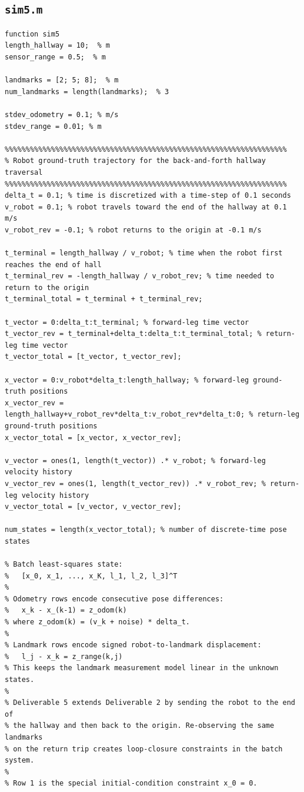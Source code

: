 \documentclass[11pt]{article}
\begin{document}
\subsection*{\texttt{sim5.m}}
\begin{lstlisting}[caption={sim5.m}, label={lst:sim5}]
function sim5
length_hallway = 10;  % m
sensor_range = 0.5;  % m

landmarks = [2; 5; 8];  % m
num_landmarks = length(landmarks);  % 3

stdev_odometry = 0.1; % m/s
stdev_range = 0.01; % m

%%%%%%%%%%%%%%%%%%%%%%%%%%%%%%%%%%%%%%%%%%%%%%%%%%%%%%%%%%%%%%%%%%%
% Robot ground-truth trajectory for the back-and-forth hallway traversal
%%%%%%%%%%%%%%%%%%%%%%%%%%%%%%%%%%%%%%%%%%%%%%%%%%%%%%%%%%%%%%%%%%%
delta_t = 0.1; % time is discretized with a time-step of 0.1 seconds
v_robot = 0.1; % robot travels toward the end of the hallway at 0.1 m/s
v_robot_rev = -0.1; % robot returns to the origin at -0.1 m/s

t_terminal = length_hallway / v_robot; % time when the robot first reaches the end of hall
t_terminal_rev = -length_hallway / v_robot_rev; % time needed to return to the origin
t_terminal_total = t_terminal + t_terminal_rev;

t_vector = 0:delta_t:t_terminal; % forward-leg time vector
t_vector_rev = t_terminal+delta_t:delta_t:t_terminal_total; % return-leg time vector
t_vector_total = [t_vector, t_vector_rev];

x_vector = 0:v_robot*delta_t:length_hallway; % forward-leg ground-truth positions
x_vector_rev = length_hallway+v_robot_rev*delta_t:v_robot_rev*delta_t:0; % return-leg ground-truth positions
x_vector_total = [x_vector, x_vector_rev];

v_vector = ones(1, length(t_vector)) .* v_robot; % forward-leg velocity history
v_vector_rev = ones(1, length(t_vector_rev)) .* v_robot_rev; % return-leg velocity history
v_vector_total = [v_vector, v_vector_rev];

num_states = length(x_vector_total); % number of discrete-time pose states

% Batch least-squares state:
%   [x_0, x_1, ..., x_K, l_1, l_2, l_3]^T
%
% Odometry rows encode consecutive pose differences:
%   x_k - x_(k-1) = z_odom(k)
% where z_odom(k) = (v_k + noise) * delta_t.
%
% Landmark rows encode signed robot-to-landmark displacement:
%   l_j - x_k = z_range(k,j)
% This keeps the landmark measurement model linear in the unknown states.
%
% Deliverable 5 extends Deliverable 2 by sending the robot to the end of
% the hallway and then back to the origin. Re-observing the same landmarks
% on the return trip creates loop-closure constraints in the batch system.
%
% Row 1 is the special initial-condition constraint x_0 = 0.


\end{lstlisting}
\end{document}
